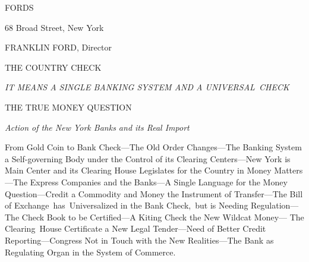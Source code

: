 \documentclass[openany,nobib]{tufte-book}
\begin{document}
\begin{LARGE}


\end{LARGE}

\vspace{0.5in}
\begin{center}
    

{\huge FORDS}

\vspace{0.2in}

{\LARGE 68 Broad Street, New York}

\vspace{0.2in}

{\large FRANKLIN FORD, Director}

\vspace{.35in}

{\LARGE THE COUNTRY CHECK}

\vspace{0.2in}

{\Large \emph{IT MEANS A SINGLE BANKING SYSTEM
AND A
UNIVERSAL~CHECK}}

\vspace{0.2in}

{\Large THE TRUE MONEY QUESTION}

\vspace{0.2in}

{\large \emph{Action of the New York Banks and its Real
Import}}

\end{center}

\vspace{0.2in}

\begin{bfseries}
    
\begin{hangparas}{0.25in}{1}
    

From Gold Coin to Bank Check---The Old Order Changes---The Banking
System a Self-governing Body under the Control of its Clearing
Centers---New York is Main Center and its Clearing House Legislates for
the Country in Money Matters---The Express Companies and the Banks---A
Single Language for the Money Question---Credit a Commodity and Money
the Instrument of Transfer---The Bill of Exchange~has~Universalized in
the Bank Check,~but is Needing Regulation---The Check Book to be
Certified---A Kiting Check the New Wildcat Money--- The Clearing~House
Certificate a New Legal Tender---Need of Better Credit
Reporting---Congress Not in Touch with the New Realities---The Bank as
Regulating Organ in the System of Commerce.

\end{hangparas}

\end{bfseries}
\end{document}

